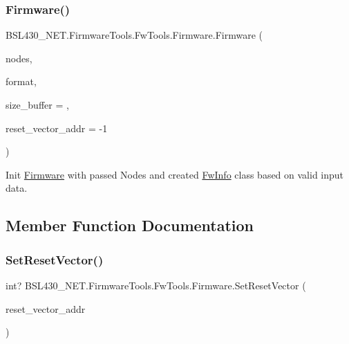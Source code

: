 \subsubsection{\texorpdfstring{Firmware()}{Firmware()}}
{\footnotesize\ttfamily B\+S\+L430\+\_\+\+N\+E\+T.\+Firmware\+Tools.\+Fw\+Tools.\+Firmware.\+Firmware (\begin{DoxyParamCaption}\item[{List$<$ \mbox{\hyperlink{class_b_s_l430___n_e_t_1_1_firmware_tools_1_1_fw_tools_1_1_fw_node}{Fw\+Node}} $>$}]{nodes,  }\item[{Fw\+Format}]{format,  }\item[{int}]{size\+\_\+buffer = {},  }\item[{int}]{reset\+\_\+vector\+\_\+addr = {\ttfamily -\/1} }\end{DoxyParamCaption})}



Init \mbox{\hyperlink{class_b_s_l430___n_e_t_1_1_firmware_tools_1_1_fw_tools_1_1_firmware}{Firmware}} with passed Nodes and created \mbox{\hyperlink{class_b_s_l430___n_e_t_1_1_firmware_tools_1_1_fw_tools_1_1_fw_info}{Fw\+Info}} class based on valid input data. 



\subsection{Member Function Documentation}
\mbox{\label{class_b_s_l430___n_e_t_1_1_firmware_tools_1_1_fw_tools_1_1_firmware_a554bd13e5c9a17d68c017d20e1d391fa}} 
\subsubsection{\texorpdfstring{SetResetVector()}{SetResetVector()}}
{\footnotesize\ttfamily int? B\+S\+L430\+\_\+\+N\+E\+T.\+Firmware\+Tools.\+Fw\+Tools.\+Firmware.\+Set\+Reset\+Vector (\begin{DoxyParamCaption}\item[{int}]{reset\+\_\+vector\+\_\+addr }\end{DoxyParamCaption})}



